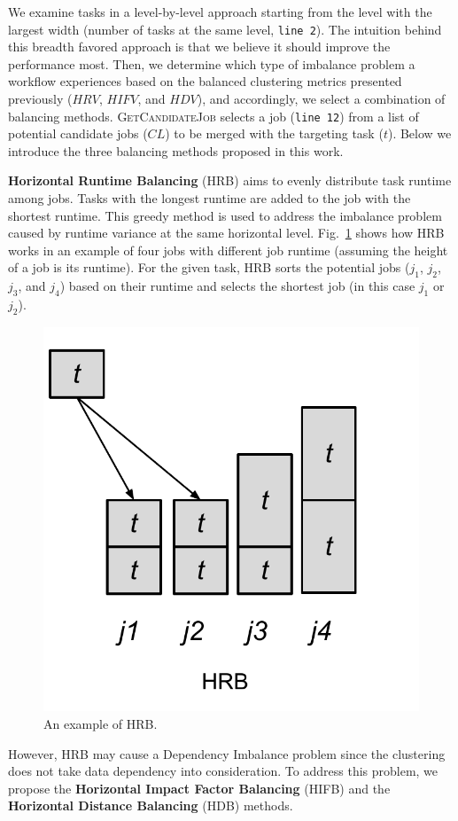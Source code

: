 \documentclass[final]{IEEEtran}
\begin{document}
We examine tasks in a level-by-level approach starting from the level with the largest width (number of tasks at the same level, \texttt{line 2}). The intuition behind this breadth favored approach is that we believe it should improve the performance most. Then, we determine which type of imbalance problem a workflow experiences based on the balanced clustering metrics presented previously ($HRV$, $HIFV$, and $HDV$), and accordingly, we select a combination of balancing methods. \textsc{GetCandidateJob} selects a job (\texttt{line 12}) from a list of potential candidate jobs ($CL$) to be merged with the targeting task ($t$). Below we introduce the three balancing methods proposed in this work.

\textbf{Horizontal Runtime Balancing} (HRB) aims to evenly distribute task runtime among jobs. Tasks with the longest runtime are added to the job with the shortest runtime. This greedy method is used to address the imbalance problem caused by runtime variance at the same horizontal level. Fig.~\ref{fig:algorithm_hrb} shows how HRB works in an example of four jobs with different job runtime (assuming the height of a job is its runtime). For the given task, HRB sorts the potential jobs ($j_1$, $j_2$, $j_3$, and $j_4$) based on their runtime and selects the shortest job (in this case $j_1$ or $j_2$). 

\begin{figure}[htb]
	\centering
	\includegraphics[width=0.5\linewidth]{figure/algorithm_hrb.pdf}
	\caption{An example of HRB.}
	\label{fig:algorithm_hrb}
	\vspace{-15pt}
\end{figure}

However, HRB may cause a Dependency Imbalance problem since the clustering does not take data dependency into consideration. To address this problem, we propose the \textbf{Horizontal Impact Factor Balancing} (HIFB) and the \textbf{Horizontal Distance Balancing} (HDB) methods. 
\end{document}
